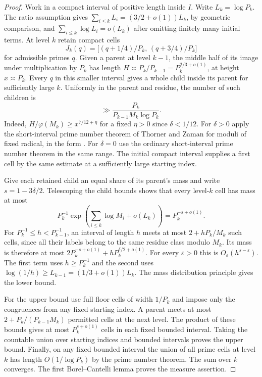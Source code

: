 \documentclass[11pt]{article}
\theoremstyle{remark}\newtheorem*{remark}{Remark}
\begin{document}
\begin{proof}
Work in a compact interval of positive length inside $I$. Write
$L_k=\log P_k$. The ratio assumption gives
$\sum_{i\le k}L_i=(3/2+o(1))L_k$, by geometric comparison, and
$\sum_{i\le k}\log L_i=o(L_k)$ after omitting finitely many initial terms.
At level $k$ retain compact cells
\[
 J_k(q)=\big[(q+1/4)/P_k,\,(q+3/4)/P_k\big]
\]
for admissible primes $q$. Given a parent at level $k-1$, the middle
half of its image under multiplication by $P_k$ has length
$H\asymp P_k/P_{k-1}=P_k^{2/3+o(1)}$, at height $x\asymp P_k$.
Every $q$ in this smaller interval gives a whole child inside its parent
for sufficiently large $k$. Uniformly in the parent and residue, the
number of such children is
\[
                   \gg \frac{P_k}{P_{k-1}M_k\log P_k}.
\]
Indeed, $H/\varphi(M_k)\ge x^{7/12+\eta}$ for a fixed $\eta>0$ since
$\delta<1/12$. For $\delta>0$ apply the short-interval prime number
theorem of Thorner and Zaman for moduli of fixed radical, in the form
\cite[Corollary 3.1 and (3.2) of the preprint]{tz}. For $\delta=0$ use
the ordinary short-interval prime number theorem in the same range.
The initial compact interval supplies a first cell by the same estimate
at a sufficiently large starting index.

Give each retained child an equal share of its parent's mass and write
$s=1-3\delta/2$. Telescoping the child bounds shows that every level-$k$
cell has mass at most
\[
  P_k^{-1}\exp\!\left(\sum_{i\le k}\log M_i+o(L_k)\right)
                         =P_k^{-s+o(1)} .
\]
For $P_k^{-1}\le h<P_{k-1}^{-1}$, an interval of length $h$ meets at most
$2+hP_k/M_k$ such cells, since all their labels belong to the same residue
class modulo $M_k$. Its mass is therefore at most
$2P_k^{-s+o(1)}+hP_k^{\delta/2+o(1)}$. For every $\varepsilon>0$ this
is $O_\varepsilon(h^{s-\varepsilon})$. The first term uses
$h\ge P_k^{-1}$ and the second uses
$\log(1/h)\ge L_{k-1}=(1/3+o(1))L_k$.
The mass distribution principle gives the lower bound.

For the upper bound use full floor cells of width $1/P_k$ and impose
only the congruences from any fixed starting index. A parent meets at
most $2+P_k/(P_{k-1}M_k)$ permitted cells at the next level. The product
of these bounds gives at most $P_k^{s+o(1)}$ cells in each fixed bounded
interval. Taking the countable union over starting indices and bounded
intervals proves the upper bound. Finally, on any fixed bounded interval
the union of all prime cells at level $k$ has length $O(1/\log P_k)$ by
the prime number theorem. The sum over $k$ converges. The first
Borel--Cantelli lemma proves the measure assertion.
\end{proof}
\end{document}
